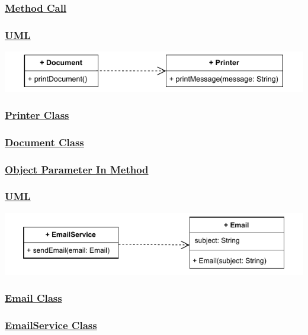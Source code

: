 \subsubsection*{\underline{Method Call}}

\subsubsection*{\underline{UML}}
\includegraphics[width=\textwidth]{Chapters/Diagram/OOP/EX3/ex3.a.drawio.pdf}


\subsubsection*{\underline{Printer Class}}


\subsubsection*{\underline{Document Class}}



\subsubsection*{\underline{Object Parameter In Method}}
\subsubsection*{\underline{UML}}
\includegraphics[width=\textwidth]{Chapters/Diagram/OOP/EX3/ex3.b.drawio.pdf}

\subsubsection*{\underline{Email Class}}


\subsubsection*{\underline{EmailService Class}}



